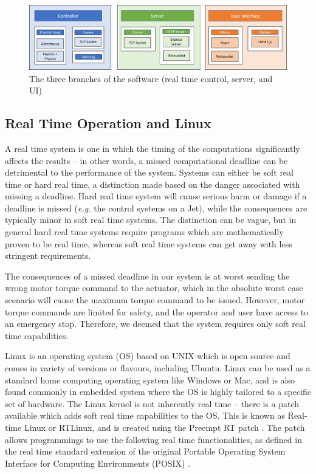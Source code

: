\documentclass[12pt]{report}
\begin{document}
		\begin{figure}[h] 
		\centering
		\includegraphics[width=\linewidth]{software}
		\caption{The three branches of the software (real time control, server, and UI)}
		\label{fig:software}
	\end{figure} 
	

	\subsection{Real Time Operation and Linux}
	
%

A real time system is one in which the timing of the computations significantly affects the results \cite{Lewine1991} --  in other words, a missed computational deadline can be detrimental to the performance of the system. Systems can either be soft real time or hard real time, a distinction made based on the danger associated with missing a deadline. Hard real time system will cause serious harm or damage if a deadline is missed (\textit{e.g.} the control systems on a Jet), while the consequences are typically minor in soft real time systems. The distinction can be vague, but in general hard real time systems require programs which are mathematically proven to be real time, whereas soft real time systems can get away with less stringent requirements. 

The consequences of a missed deadline in our system is at worst sending the wrong motor torque command to the actuator, which in the absolute worst case scenario will cause the maximum torque command to be issued. However, motor torque commands are limited for safety, and the operator and user have access to an emergency stop. Therefore, we deemed that the system requires only soft real time capabilities. 

Linux is an operating system (OS) based on UNIX which is open source and comes in variety of versions or flavours, including Ubuntu. Linux can be used as a standard home computing operating system like Windows or Mac, and is also found commonly in embedded system where the OS is highly tailored to a specific set of hardware. The Linux kernel is not inherently real time -- there is a patch available which adds soft real time capabilities to the OS. This is known as Real-time Linux or RTLinux, and is created using the Preempt RT patch \cite{SebastianSiewior2019}. The patch allows programmings to use the following real time functionalities, as defined in the real time standard extension of the original Portable Operating System Interface for Computing Environments (POSIX) \cite{Obenland}.
\end{document}
